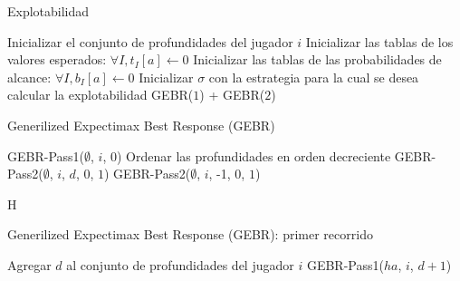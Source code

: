 \begin{algorithm}[H]
\caption{Explotabilidad}
\label{algorithm:explotabilidad}
\begin{algorithmic}[1]
    \State Inicializar el conjunto de profundidades del jugador $i$
    \State Inicializar las tablas de los valores esperados: $\forall I, t_I[a] \leftarrow 0$
    \State Inicializar las tablas de las probabilidades de alcance: $\forall I, b_I[a] \leftarrow 0$
    \State Inicializar $\sigma$ con la estrategia para la cual se desea calcular la explotabilidad
    \State
        \State \Return GEBR($1$) + GEBR($2$)
    \EndFunction
\end{algorithmic}
\end{algorithm}

\begin{algorithm}[H]
\caption{Generilized Expectimax Best Response (GEBR)}
\label{algorithm:GEBR}
\begin{algorithmic}[1]
        \State GEBR-Pass1($\emptyset$, $i$, $0$)
        \State Ordenar las profundidades en orden decreciente
            \State GEBR-Pass2($\emptyset$, $i$, $d$, $0$, $1$)
        \EndFor
        \State \Return GEBR-Pass2($\emptyset$, $i$, -1, $0$, $1$)
    \EndFunction
\end{algorithmic}
\end{algorithm}

\begin{algorithm}{H}
\caption{Generilized Expectimax Best Response (GEBR): primer recorrido}
\label{algorithm:gebr-pass1}
\begin{algorithmic}[1]
            \State \Return
        \EndIf
            \State Agregar $d$ al conjunto de profundidades del jugador $i$
        \EndIf
            \State GEBR-Pass1($ha$, $i$, $d+1$)
        \EndFor
    \EndFunction
\end{algorithmic}
\end{algorithm}

